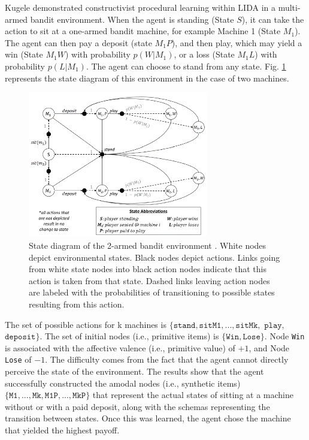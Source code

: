 \documentclass[runningheads]{llncs}
\begin{document}
Kugele \cite{kugele2025_constructivist} demonstrated constructivist procedural learning within LIDA in a multi-armed bandit environment.
When the agent is standing (State $S$), it can take the action to sit at a one-armed bandit machine, for example Machine 1 (State $M_1$).
The agent can then pay a deposit (state $M_1P$), and then play, which may yield a win (State $M_1W$) with probability $p(W|M_1)$, or a loss (State $M_1L$) with probability $p(L|M_1)$. The agent can choose to stand from any state.
Fig. \ref{fig:lida_bench} represents the state diagram of this environment in the case of two machines. 

\begin{figure}
	\centering
	\includegraphics[width=0.7\textwidth]{Figure_LIDA_bench.png}
	\caption{State diagram of the 2-armed bandit environment \cite[Fig. 5]{kugele2025_constructivist}.
	White nodes depict environmental states.
	Black nodes depict actions. 
	Links going from white state nodes into black action nodes indicate that this action is taken from that state. 
	Dashed links leaving action nodes are labeled with the probabilities of transitioning to possible states resulting from this action.} 
	\label{fig:lida_bench}
\end{figure}

The set of possible actions for k machines is $\{ \texttt{stand}, \texttt{sitM1},..., \texttt{sitMk},$ $\texttt{play},$ $\texttt{deposit}\}$. 
The set of initial nodes (i.e., primitive items) is $\{\texttt{Win}, \texttt{Lose} \}$.
Node \texttt{Win} is associated with the affective valence (i.e., primitive value) of $+1$, and Node \texttt{Lose} of $-1$.   
The difficulty comes from the fact that the agent cannot directly perceive the state of the environment.
The results show that the agent successfully constructed the amodal nodes (i.e., synthetic items) $\{ \texttt{M1},  ..., \texttt{Mk}, \texttt{M1P}, ...,  \texttt{MkP} \}$ that represent the actual states of sitting at a machine without or with a paid deposit, along with the schemas representing the transition between states. 
Once this was learned, the agent chose the machine that yielded the highest payoff.
\end{document}

